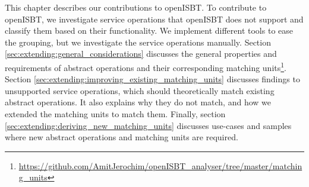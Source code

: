 This chapter describes our contributions to openISBT. To contribute to openISBT, we investigate service operations that openISBT does not support and classify them based on their functionality. We implement different tools to ease the grouping, but we investigate the service operations manually. Section \ref{sec:extending:general_considerations} discusses the general properties and requirements of abstract operations and their corresponding matching units\footnote{\url{https://github.com/AmitJerochim/openISBT_analyser/tree/master/matching_units}}. Section \ref{sec:extending:improving_existing_matching_units} discusses findings to unsupported service operations, which should theoretically match existing abstract operations. It also explains why they do not match, and how we extended the matching units to match them. Finally, section \ref{sec:extending:deriving_new_matching_units} discusses use-cases and samples where new abstract operations and matching units are required. 
